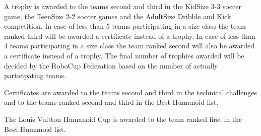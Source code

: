 A trophy is awarded to the teams second and third in the KidSize 3-3 soccer game, the TeenSize 2-2 soccer games and the AdultSize Dribble and Kick competition. In case of less than 5 teams participating in a size class the team ranked third will be awarded a certificate instead of a trophy. In case of less than 4 teams participating in a size class the team ranked second will also be awarded a certificate instead of a trophy. The final number of trophies awarded will be decided by the RoboCup Federation based on the number of actually participating teams.

\bigskip

Certificates are awarded to the teams second and third in the technical challenges and to the teams ranked second and third in the Best Humanoid list.

\bigskip

The Louis Vuitton Humanoid Cup is awarded to the team ranked first in the Best Humanoid list.